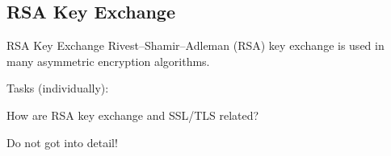 ﻿\subsection{RSA Key Exchange}

\begin{frame}{RSA Key Exchange}
  \alert{Rivest–Shamir–Adleman (RSA)} key exchange is used in many \alert{asymmetric} encryption algorithms.
  \begin{exampleblock}{Tasks (individually):}
    \begin{description}[???]
        \item [???] How are \alert{RSA} key exchange and SSL/TLS related?
        \begin{description}
            \item [$\Rightarrow$ Hint:] Do not got into detail!
        \end{description}
    \end{description}
  \end{exampleblock}
\end{frame}

